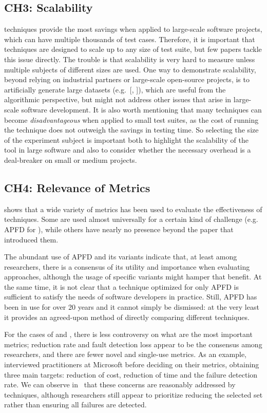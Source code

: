 \subsection{CH3: Scalability}
\rt techniques provide the most savings when applied to large-scale software projects, which can have multiple thousands of test cases.
Therefore, it is important that techniques are designed to scale up to any size of test suite, but few papers tackle this issue directly.
The trouble is that scalability is very hard to measure unless multiple subjects of different sizes are used.
One way to demonstrate scalability, beyond relying on industrial partners or large-scale open-source projects, is to artificially generate large datasets (e.g.~[, ]), which are useful from the algorithmic perspective, but might not address other issues that arise in large-scale software development.
It is also worth mentioning that many \rt techniques can become \textit{disadvantageous} when applied to small test suites, as the cost of running the technique does not outweigh the savings in testing time.
So selecting the size of the experiment subject is important both to highlight the scalability of the tool in large software and also to consider whether the necessary overhead is a deal-breaker on small or medium projects.


\subsection{CH4: Relevance of Metrics}
 shows that a wide variety of metrics has been used to evaluate the effectiveness of \rt techniques.
Some are used almost universally for a certain kind of challenge (e.g. APFD for \tcp), while others have nearly no presence beyond the paper that introduced them.

The abundant use of APFD and its variants indicate that, at least among researchers, there is a consensus of its utility and importance when evaluating \tcp approaches, although the usage of specific variants might hamper that benefit.
At the same time, it is not clear that a technique optimized for only APFD is sufficient to satisfy the needs of software developers in practice.
Still, APFD has been in use for over 20 years and it cannot simply be dismissed: at the very least it provides an agreed-upon method of directly comparing different techniques.

For the cases of \tcs and \tsr, there is less controversy on what are the most important metrics; reduction rate and fault detection loss appear to be the consensus among researchers, and there are fewer novel and single-use metrics.
As an example,~ interviewed practitioners at Microsoft before deciding on their \tcs metrics, obtaining three main targets: reduction of cost, reduction of time and the failure detection rate.
We can observe in~ that these concerns are reasonably addressed by \tcs techniques, although researchers still appear to prioritize reducing the selected set rather than ensuring all failures are detected.

